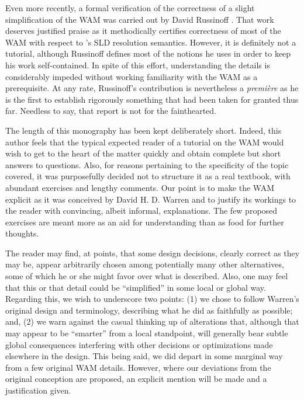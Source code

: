 Even more recently, a formal verification of the correctness of a slight
simplification of the WAM was carried out by David Russinoff \cite{Rus89}. That
work deserves justified praise as it methodically certifies correctness of most
of the WAM with respect to \prolog’s SLD resolution semantics. However, it is
definitely not a tutorial, although Russinoff defines most of the notions he
uses in order to keep his work self-contained. In spite of this effort,
understanding the details is considerably impeded without working familiarity
with the WAM as a prerequisite. At any rate, Russinoff’s contribution is
nevertheless a \emph{premi\`ere} as he is the first to establish rigorously
something that had been taken for granted thus far. Needless to say, that report
is not for the fainthearted.
 
\secdown


The length of this monography has been kept deliberately short. Indeed, this
author feels that the typical expected reader of a tutorial on the WAM would
wish to get to the heart of the matter quickly and obtain complete but short
answers to questions. Also, for reasons pertaining to the specificity of the
topic covered, it was purposefully decided not to structure it as a real
textbook, with abundant exercises and lengthy comments. Our point is to make the
WAM explicit as it was conceived by David H. D. Warren and to justify its
workings to the reader with convincing, albeit informal, explanations. The few
proposed exercises are meant more as an aid for understanding than as food for
further thoughts.

The reader may find, at points, that some design decisions, clearly correct as
they may be, appear arbitrarily chosen among potentially many other
alternatives, some of which he or she might favor over what is described. Also,
one may feel that this or that detail could be ``simplified'' in some local or
global way. Regarding this, we wish to underscore two points: (1) we chose to
follow Warren’s original design and terminology, describing what he did as
faithfully as possible; and, (2) we warn against the casual thinking up of
alterations that, although that may appear to be “smarter” from a local
standpoint, will generally bear subtle global consequences interfering with
other decisions or optimizations made elsewhere in the design.
This being said, we did depart in some marginal way from a few original WAM
details. However, where our deviations from the original conception are
proposed, an explicit mention will be made and a justification given.


